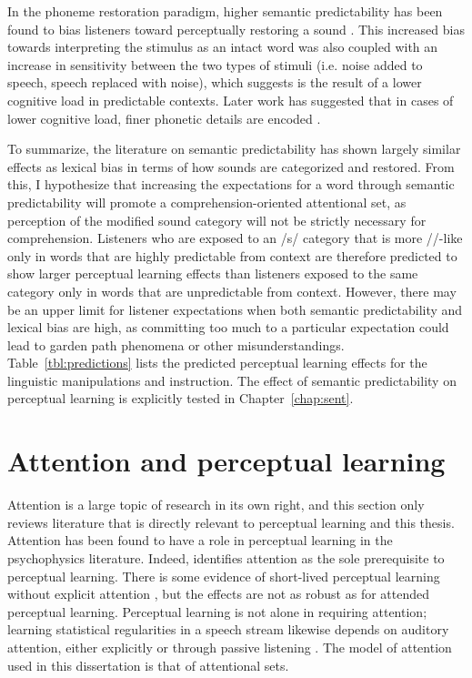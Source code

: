 In the phoneme restoration paradigm, higher semantic predictability has been found to bias listeners toward perceptually restoring a sound \citep{Samuel1981}.
This increased bias towards interpreting the stimulus as an intact word was also coupled with an increase in sensitivity between the two types of stimuli (i.e. noise added to speech, speech replaced with noise), which \citet{Samuel1981} suggests is the result of a lower cognitive load in predictable contexts. Later work has suggested that in cases of lower cognitive load, finer phonetic details are encoded \citep[see also][]{Mattys2011}.

To summarize, the literature on semantic predictability has shown largely similar effects as lexical bias in terms of how sounds are categorized and restored.  
From this, I hypothesize that increasing the expectations for a word through semantic predictability will promote a comprehension-oriented attentional set, as perception of the modified sound category will not be strictly necessary for comprehension.
Listeners who are exposed to an /s/ category that is more /\textesh/-like only in words that are highly predictable from context are therefore predicted to show larger perceptual learning effects than listeners exposed to the same category only in words that are unpredictable from context.
However, there may be an upper limit for listener expectations when both semantic predictability and lexical bias are high, as committing too much to a particular expectation could lead to garden path phenomena \citep{Levy2008} or other misunderstandings.
Table~\ref{tbl:predictions} lists the predicted perceptual learning effects for the linguistic manipulations and instruction.
The effect of semantic predictability on perceptual learning is explicitly tested in Chapter~\ref{chap:sent}.

\section{Attention and perceptual learning}
\label{sec:attention}

Attention is a large topic of research in its own right, and this section only reviews literature that is directly relevant to perceptual learning and this thesis.
Attention has been found to have a role in perceptual learning in the psychophysics literature. 
Indeed, \citet{Gibson1953} identifies attention as the sole prerequisite to perceptual learning.
There is some evidence of short-lived perceptual learning without explicit attention \citep{Watanabe2001}, but the effects are not as robust as for attended perceptual learning.
Perceptual learning is not alone in requiring attention; learning statistical regularities in a speech stream likewise depends on auditory attention, either explicitly or through passive listening \citetext{\citealp{Toro2005,Saffran1997}, but see \citealp{Finn2014}}.
The model of attention used in this dissertation is that of attentional sets.

